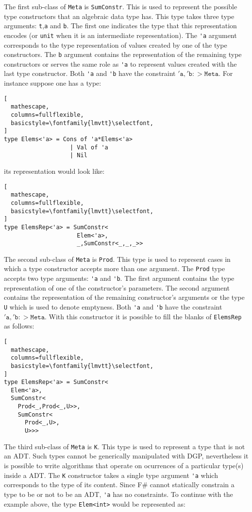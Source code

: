 \documentclass{sigplanconf}
\begin{document}
The first sub-class of \verb+Meta+ is \verb+SumConstr+. This is used to represent the possible type constructors that an algebraic data type has. This type takes three type arguments: \verb+t+,\verb+a+ and \verb+b+. The first one indicates the type that this representation encodes (or \verb+unit+ when it is an intermediate representation). The \verb+'a+ argument corresponds to the type representation of values created by one of the type constructors. The \verb+b+ argument contains the representation of the remaining type constructors or serves the same role as \verb+'a+ to represent values created with the last type constructor. Both \verb+'a+ and \verb+'b+ have the constraint $\mathtt{'a},\mathtt{'b} :> \mathtt{Meta}$. For instance suppose one has a type:
\begin{lstlisting}[
  mathescape,
  columns=fullflexible,
  basicstyle=\fontfamily{lmvtt}\selectfont,
]
type Elems<'a> = Cons of 'a*Elems<'a> 
                   | Val of 'a 
                   | Nil 
\end{lstlisting}
its representation would look like:
\begin{lstlisting}[
  mathescape,
  columns=fullflexible,
  basicstyle=\fontfamily{lmvtt}\selectfont,
]
type ElemsRep<'a> = SumConstr<
                     Elem<'a>,
                     _,SumConstr<_,_,_>>
\end{lstlisting}
The second sub-class of \verb+Meta+ is \verb+Prod+. This type is used to represent cases in which a type constructor accepts more than one argument. The \verb+Prod+ type accepts two type arguments: \verb+'a+ and \verb+'b+. The first argument contains the type representation of one of the constructor's parameters. The second argument contains the representation of the remaining constructor's arguments or the type \verb+U+ which is used to denote emptyness. Both \verb+'a+ and \verb+'b+ have the constraint $\mathtt{'a},\mathtt{'b} :> \mathtt{Meta}$. With this constructor it is possible to fill the blanks of \verb+ElemsRep+ as follows:
\begin{lstlisting}[
  mathescape,
  columns=fullflexible,
  basicstyle=\fontfamily{lmvtt}\selectfont,
]
type ElemsRep<'a> = SumConstr<
  Elem<'a>,
  SumConstr<
    Prod<_,Prod<_,U>>,
    SumConstr<
      Prod<_,U>,
      U>>>
\end{lstlisting}
The third sub-class of \verb+Meta+ is \verb+K+. This type is used to represent a type that is not an ADT. Such types cannot be generically manipulated with DGP, nevertheless it is possible to write algorithms that operate on ocurrences of a particular type(s) inside a ADT. The \verb+K+ constructor takes a single type argument \verb+'a+ which corresponds to the type of its content. Since F\# cannot statically constrain a type to be or not to be an ADT, \verb+'a+ has no constraints. To continue with the example above, the type \verb+Elem<int>+ would be represented as:
\end{document}
